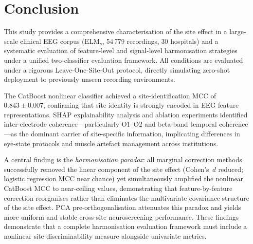 \documentclass[preprint,12pt]{elsarticle}
\begin{document}
\section{Conclusion}
\label{sec:conclusion}

This study provides a comprehensive characterisation of the site
effect in a large-scale clinical EEG corpus ($\mathrm{ELM}_s$,
54\,779 recordings, 30 hospitals) and a systematic evaluation of
feature-level and signal-level harmonisation strategies under a
unified two-classifier evaluation framework.
All conditions are evaluated under a rigorous Leave-One-Site-Out
protocol, directly simulating zero-shot deployment to previously
unseen recording environments.

The CatBoost nonlinear classifier achieved a site-identification MCC
of $0.843 \pm 0.007$, confirming that site identity is strongly
encoded in EEG feature representations.
SHAP explainability analysis and ablation experiments identified
inter-electrode coherence---particularly O1--O2 and beta-band
temporal coherence---as the dominant carrier of site-specific
information, implicating differences in eye-state protocols and
muscle artefact management across institutions.

A central finding is the \emph{harmonisation paradox}: all marginal
correction methods successfully removed the linear component of the
site effect (Cohen's~$d$ reduced; logistic regression MCC near
chance) yet simultaneously amplified the nonlinear CatBoost MCC to
near-ceiling values, demonstrating that feature-by-feature correction
reorganises rather than eliminates the multivariate covariance
structure of the site effect.
PCA pre-orthogonalisation attenuates this paradox and yields more
uniform and stable cross-site neuroscreening performance.
These findings demonstrate that a complete harmonisation evaluation
framework must include a nonlinear site-discriminability measure
alongside univariate metrics.
\end{document}
